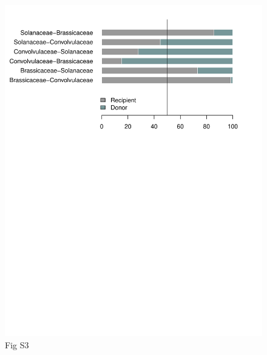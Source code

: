 \documentclass[
  12pt,
]{article}
\begin{document}
\begin{figure}
\centering
\includegraphics{Supp_Material_files/figure-latex/unnamed-chunk-5-1.pdf}
\caption{Fig S3}
\end{figure}

\newpage
\end{document}
